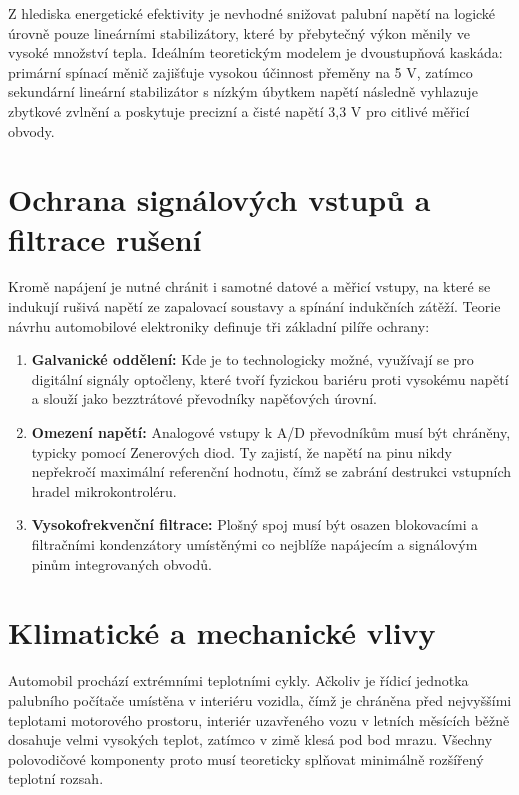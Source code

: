 Z hlediska energetické efektivity je nevhodné snižovat palubní napětí na logické úrovně pouze lineárními stabilizátory, 
které by přebytečný výkon měnily ve vysoké množství tepla. Ideálním teoretickým modelem je dvoustupňová kaskáda: primární spínací měnič zajišťuje vysokou 
účinnost přeměny na 5 V, zatímco sekundární lineární stabilizátor s nízkým úbytkem napětí následně vyhlazuje zbytkové zvlnění a poskytuje precizní a čisté napětí 3,3 V 
pro citlivé měřicí obvody.

\section{Ochrana signálových vstupů a filtrace rušení}
Kromě napájení je nutné chránit i samotné datové a měřicí vstupy, na které se indukují rušivá napětí ze zapalovací soustavy a spínání indukčních zátěží. 
Teorie návrhu automobilové elektroniky definuje tři základní pilíře ochrany:

\begin{enumerate}
    \item \textbf{Galvanické oddělení:} Kde je to technologicky možné, využívají se pro digitální signály optočleny, 
    které tvoří fyzickou bariéru proti vysokému napětí a slouží jako bezztrátové převodníky napěťových úrovní.
    \item \textbf{Omezení napětí:} Analogové vstupy k A/D převodníkům musí být chráněny, typicky pomocí Zenerových diod. 
    Ty zajistí, že napětí na pinu nikdy nepřekročí maximální referenční hodnotu, čímž se zabrání destrukci vstupních hradel mikrokontroléru.
    \item \textbf{Vysokofrekvenční filtrace:} Plošný spoj musí být osazen blokovacími a filtračními kondenzátory umístěnými co nejblíže 
    napájecím a signálovým pinům integrovaných obvodů.
\end{enumerate}

\section{Klimatické a mechanické vlivy}
Automobil prochází extrémními teplotními cykly. Ačkoliv je řídicí jednotka palubního počítače umístěna v interiéru vozidla, čímž je chráněna před nejvyššími teplotami 
motorového prostoru, interiér uzavřeného vozu v letních měsících běžně dosahuje velmi vysokých teplot, zatímco v zimě klesá pod bod mrazu. 
Všechny polovodičové komponenty proto musí teoreticky splňovat minimálně rozšířený teplotní rozsah.

